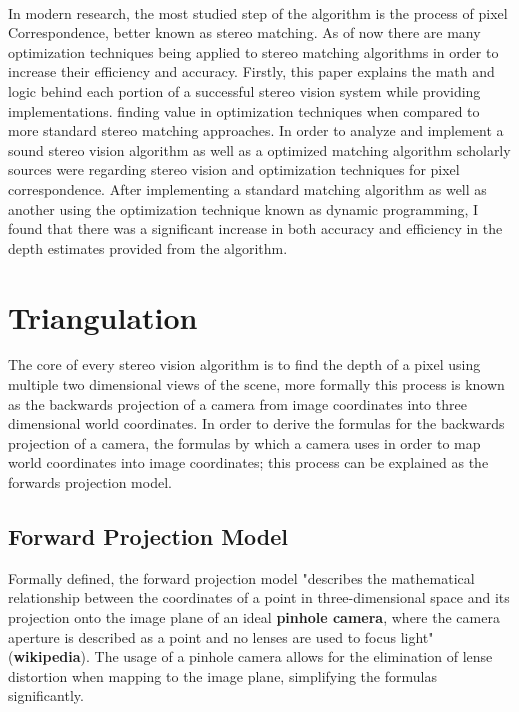 \documentclass[11pt]{scrartcl}
\begin{document}
\\

In modern research, the most studied step of the algorithm is the process of pixel Correspondence,
better known as stereo matching. As of now there are many optimization techniques being applied
to stereo matching algorithms in order to increase their efficiency and accuracy. Firstly, this paper explains
the math and logic behind each portion of a successful stereo vision system while providing implementations.  finding value in optimization techniques
when compared to more standard stereo matching approaches. In order to analyze and implement a sound stereo vision algorithm
as well as a optimized matching algorithm scholarly sources were regarding stereo vision and optimization
techniques for pixel correspondence. After implementing a standard matching algorithm as well as another using
the optimization technique known as dynamic programming, I found that there was a significant increase
in both accuracy and efficiency in the depth estimates provided from the algorithm.


\section{Triangulation}

The core of every stereo vision algorithm is to find the depth of a pixel
using multiple two dimensional views of the scene, more formally
this process is known as the backwards projection of a camera from image
coordinates into three dimensional world coordinates. In order to derive the
formulas for the backwards projection of a camera, the formulas by which
a camera uses in order to map world coordinates into image coordinates; this
process can be explained as the forwards projection model.
\subsection{Forward Projection Model}

Formally defined, the forward projection model "describes the mathematical relationship
between the coordinates of a point in three-dimensional space and its projection onto the image
plane of an ideal \textbf{pinhole camera}, where the camera aperture is described as a point and no lenses
are used to focus light" (\textbf{wikipedia}). The usage of a pinhole camera allows
for the elimination of lense distortion when mapping to the image plane, simplifying
the formulas significantly.
\end{document}
